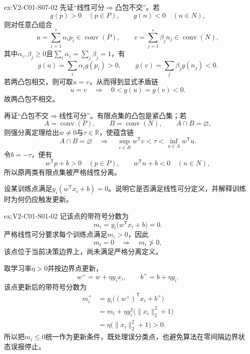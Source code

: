 \begin{SLChapterExercisePairSection}
\begin{chapterexercisesolution}{ex:V2-C01-S07-02}
先证“线性可分$\Rightarrow$凸包不交”。若
\[
g(p)>0\quad(p\in P),
\qquad
g(n)<0\quad(n\in N),
\]
则对任意凸组合
\[
u=\sum_{i=1}^{r}\alpha_i p_i\in\operatorname{conv}(P),
\qquad
v=\sum_{j=1}^{s}\beta_j n_j\in\operatorname{conv}(N),
\]
其中$\alpha_i,\beta_j\geq0$且$\sum_i\alpha_i=\sum_j\beta_j=1$，有
\[
g(u)=\sum_i\alpha_i g(p_i)>0,
\qquad
g(v)=\sum_j\beta_j g(n_j)<0.
\]
若两凸包相交，则可取$u=v$，从而得到显式矛盾链
\[
u=v
\quad\Longrightarrow\quad
0<g(u)=g(v)<0.
\]
故两凸包不相交。

再证“凸包不交$\Rightarrow$线性可分”。有限点集的凸包是紧凸集；若
\[
A=\operatorname{conv}(P),
\qquad
B=\operatorname{conv}(N),
\qquad
A\cap B=\varnothing,
\]
则强分离定理给出$w\neq0$与$\tau\in\mathbb R$，使蕴含链
\[
A\cap B=\varnothing
\quad\Longrightarrow\quad
\sup_{v\in B}w^{\mathsf T}v
<\tau
<\inf_{u\in A}w^{\mathsf T}u.
\]
令$b=-\tau$，便有
\[
w^{\mathsf T}p+b>0\quad(p\in P),
\qquad
w^{\mathsf T}n+b<0\quad(n\in N),
\]
所以原两类有限点集被严格线性分离。
\end{chapterexercisesolution}
\fi

\SLLectureSupplementExercises

\begin{exercise}\label{ex:V2-C01-S01-02}
设某训练点满足$y_i(w^{\mathsf T}x_i+b)=0$。说明它是否满足线性可分定义，并解释训练时为何仍应触发更新。
\end{exercise}
\ifSLFullEdition
{}\label{sol:V2-C01-S01-02}
\begin{chapterexercisesolution}{ex:V2-C01-S01-02}
记该点的带符号分数为
\[
m_i=y_i\bigl(w^{\mathsf T}x_i+b\bigr)=0.
\]
严格线性可分要求每个训练点满足$m_i>0$，因此
\[
m_i=0\quad\Longrightarrow\quad m_i\not>0,
\]
该点位于当前决策边界上，尚未满足严格分离定义。

取学习率$\eta>0$并按边界点更新，
\[
w^+=w+\eta y_i x_i,
\qquad
b^+=b+\eta y_i.
\]
该点更新后的带符号分数为
\[
\begin{aligned}
m_i^+
&=y_i\bigl((w^+)^{\mathsf T}x_i+b^+\bigr)\\
&=m_i+\eta y_i^2\bigl(\lVert x_i\rVert_2^2+1\bigr)\\
&=\eta\bigl(\lVert x_i\rVert_2^2+1\bigr)>0.
\end{aligned}
\]
所以把$m_i\leq0$统一作为更新条件，既处理误分类点，也避免算法在零间隔边界状态误报停止。
\end{chapterexercisesolution}
\fi


\end{SLChapterExercisePairSection}
